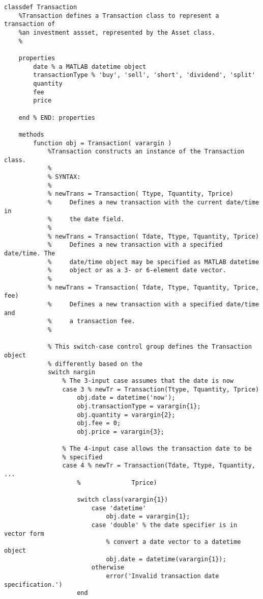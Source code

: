 \begin{lstlisting}[style=Matlab-editor]
classdef Transaction
    %Transaction defines a Transaction class to represent a transaction of
    %an investment assset, represented by the Asset class.
    %
    
    properties
        date % a MATLAB datetime object
        transactionType % 'buy', 'sell', 'short', 'dividend', 'split'
        quantity
        fee
        price
        
    end % END: properties
    
    methods
        function obj = Transaction( varargin )
            %Transaction constructs an instance of the Transaction class.
            %
            % SYNTAX:
            %
            % newTrans = Transaction( Ttype, Tquantity, Tprice)
            %     Defines a new transaction with the current date/time in
            %     the date field.
            %
            % newTrans = Transaction( Tdate, Ttype, Tquantity, Tprice)
            %     Defines a new transaction with a specified date/time. The
            %     date/time object may be specified as MATLAB datetime
            %     object or as a 3- or 6-element date vector.
            %
            % newTrans = Transaction( Tdate, Ttype, Tquantity, Tprice, fee)
            %     Defines a new transaction with a specified date/time and
            %     a transaction fee.
            %
            
            % This switch-case control group defines the Transaction object
            % differently based on the 
            switch nargin
                % The 3-input case assumes that the date is now
                case 3 % newTr = Transaction(Ttype, Tquantity, Tprice)
                    obj.date = datetime('now');
                    obj.transactionType = varargin{1};
                    obj.quantity = varargin{2};
                    obj.fee = 0;
                    obj.price = varargin{3};
                    
                % The 4-input case allows the transaction date to be
                % specified
                case 4 % newTr = Transaction(Tdate, Ttype, Tquantity, ...
                    %              Tprice)
                    
                    switch class(varargin{1})
                        case 'datetime'
                            obj.date = varargin{1};
                        case 'double' % the date specifier is in vector form
                            % convert a date vector to a datetime object
                            obj.date = datetime(varargin{1});
                        otherwise
                            error('Invalid transaction date specification.')
                    end
                    

\end{lstlisting}
